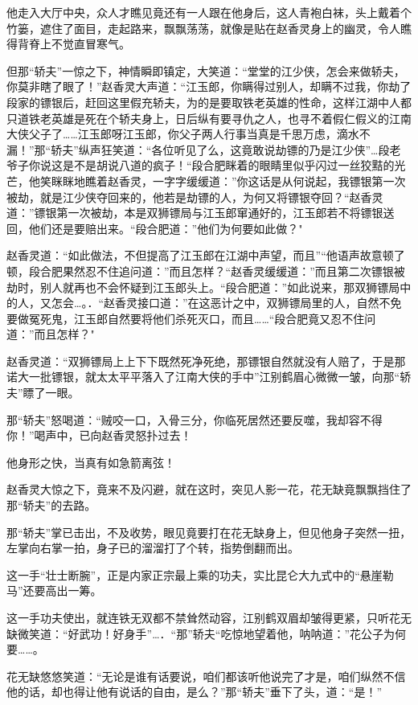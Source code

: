 \documentclass[12pt,oneside]{book}
\begin{document}
他走入大厅中央，众人才瞧见竟还有一人跟在他身后，这人青袍白袜，头上戴着个竹篓，遮住了面目，走起路来，飘飘荡荡，就像是贴在赵香灵身上的幽灵，令人瞧得背脊上不觉直冒寒气。

但那``轿夫''一惊之下，神情瞬即镇定，大笑道：``堂堂的江少侠，怎会来做轿夫，你莫非瞎了眼了！''赵香灵大声道：``江玉郎，你瞒得过别人，却瞒不过我，你劫了段家的镖银后，赶回这里假充轿夫，为的是要取铁老英雄的性命，这样江湖中人都只道铁老英雄是死在个轿夫身上，日后纵有要寻仇之人，也寻不着假仁假义的江南大侠父子了\ldots\ldots 江玉郎呀江玉郎，你父子两人行事当真是千思万虑，滴水不漏！''那``轿夫''纵声狂笑道：``各位听见了么，这竟敢说劫镖的乃是江少侠''\ldots 段老爷子你说这是不是胡说八道的疯子！``段合肥眯着的眼睛里似乎闪过一丝狡黠的光芒，他笑眯眯地瞧着赵香灵，一字字缓缓道：''你这话是从何说起，我镖银第一次被劫，就是江少侠夺回来的，他若是劫镖的人，为何又将镖银夺回？``赵香灵道：''镖银第一次被劫，本是双狮镖局与江玉郎窜通好的，江玉郎若不将镖银送回，他们还是要赔出来。``段合肥道：''他们为何要如此做？"

赵香灵道：``如此做法，不但提高了江玉郎在江湖中声望，而且''``他语声故意顿了顿，段合肥果然忍不住追问道：''而且怎样？``赵香灵缓缓道：''而且第二次镖银被劫时，别人就再也不会怀疑到江玉郎头上。``段合肥道：''如此说来，那双狮镖局中的人，又怎会\ldots。．``赵香灵接口道：''在这恶计之中，双狮镖局里的人，自然不免要做冤死鬼，江玉郎自然要将他们杀死灭口，而且\ldots\ldots{}``段合肥竟又忍不住问道：''而且怎样？"

赵香灵道：``双狮镖局上上下下既然死净死绝，那镖银自然就没有人赔了，于是那诺大一批镖银，就太太平平落入了江南大侠的手中''江别鹤眉心微微一皱，向那``轿夫''瞟了一眼。

那``轿夫''怒喝道：``贼咬一口，入骨三分，你临死居然还要反噬，我却容不得你！''喝声中，已向赵香灵怒扑过去！

他身形之快，当真有如急箭离弦！

赵香灵大惊之下，竟来不及闪避，就在这时，突见人影一花，花无缺竟飘飘挡住了那``轿夫''的去路。

那``轿夫''掌已击出，不及收势，眼见竟要打在花无缺身上，但见他身子突然一扭，左掌向右掌一拍，身子已的溜溜打了个转，指势倒翻而出。

这一手``壮士断腕''，正是内家正宗最上乘的功夫，实比昆仑大九式中的``悬崖勒马''还要高出一筹。

这一手功夫使出，就连铁无双都不禁耸然动容，江别鹤双眉却皱得更紧，只听花无缺微笑道：``好武功！好身手''\ldots．``那''轿夫``吃惊地望着他，呐呐道：''花公子为何要\ldots\ldots。

花无缺悠悠笑道：``无论是谁有话要说，咱们都该听他说完了才是，咱们纵然不信他的话，却也得让他有说话的自由，是么？''那``轿夫''垂下了头，道：``是！''
\end{document}
